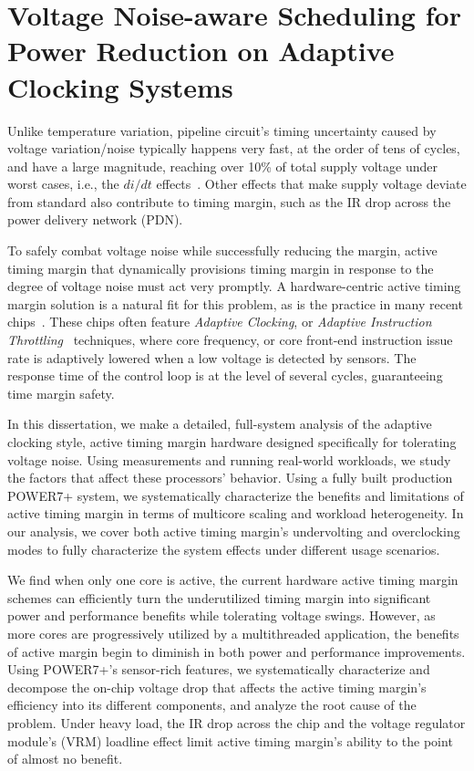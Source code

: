 
\chapter{Voltage Noise-aware Scheduling for Power Reduction on Adaptive Clocking Systems}

\label{sec:voltage}

Unlike temperature variation, pipeline circuit's timing uncertainty caused by voltage variation/noise typically happens very fast, at the order of tens of cycles, and have a large magnitude, reaching over 10\% of total supply voltage under worst cases, i.e., the $di/dt$ effects~\cite{reddi2010voltage}. Other effects that make supply voltage deviate from standard also contribute to timing margin, such as the IR drop across the power delivery network (PDN).

To safely combat voltage noise while successfully reducing the margin, active timing margin that dynamically provisions timing margin in response to the degree of voltage noise must act very promptly. A hardware-centric active timing margin solution is a natural fit for this problem, as is the practice in many recent chips~\cite{kurd2008next,lefurgy2011active,bowman201222nm,grenat20145,tokunaga20145,bowman20158}. These chips often feature \textit{Adaptive Clocking}, or \textit{Adaptive Instruction Throttling}~\cite{webel2015robust} techniques, where core frequency, or core front-end instruction issue rate is adaptively lowered when a low voltage is detected by sensors. The response time of the control loop is at the level of several cycles, guaranteeing time margin safety.

In this dissertation, we make a detailed, full-system analysis of the adaptive clocking style, active timing margin hardware designed specifically for tolerating voltage noise. Using measurements and running real-world workloads, we study the factors that affect these processors' behavior. Using a fully built production POWER7+ system, we systematically characterize the benefits and limitations of active timing margin in terms of multicore scaling and workload heterogeneity. In our analysis, we cover both active timing margin's undervolting and overclocking modes to fully characterize the system effects under different usage scenarios. 

We find when only one core is active, the current hardware active timing margin schemes can efficiently turn the underutilized timing margin into significant power and performance benefits while tolerating voltage swings. However, as more cores are progressively utilized by a multithreaded application, the benefits of active margin begin to diminish in both power and performance improvements. Using POWER7+'s sensor-rich features, we systematically characterize and decompose the on-chip voltage drop that affects the active timing margin's efficiency into its different components, and analyze the root cause of the problem. Under heavy load, the IR drop across the chip and the voltage regulator module's (VRM) loadline effect limit active timing margin's ability to the point of almost no benefit. 

